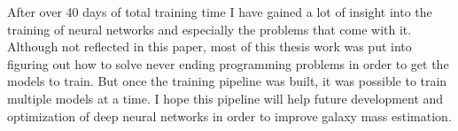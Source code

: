 After over 40 days of total training time I have gained a lot of insight into the training of neural networks and especially the problems that come with it. Although not reflected in this paper, most of this thesis work was put into figuring out how to solve never ending programming problems in order to get the models to train. But once the training pipeline was built, it was possible to train multiple models at a time. I hope this pipeline will help future development and optimization of deep neural networks in order to improve galaxy mass estimation. 